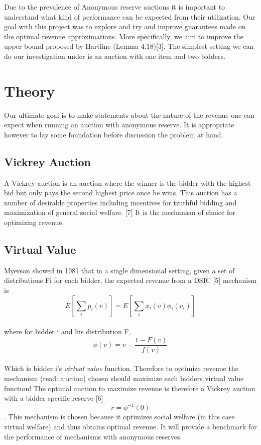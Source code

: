 \documentclass{acm_proc_article-sp}
\begin{document}
Due to the prevalence of Anonymous reserve auctions it is important to understand what kind of performance can be expected from their utilization. Our goal with this project was to explore and try and improve guarantees made on the optimal revenue approximations. More specifically, we aim to improve the upper bound proposed by Hartline (Lemma 4.18)[3]. The simplest setting we can do our investigation under is an auction with one item and two bidders.

\section{Theory}
Our ultimate goal is to make statements about the nature of the revenue one can expect when running an auction with anonymous reserve. It is appropriate however to lay some foundation before discussion the problem at hand.

\subsection{Vickrey Auction}
A Vickrey auction is an auction where the winner is the bidder with the highest bid but only pays the second highest price once he wins. This auction has a number of desirable properties including incentives for truthful bidding and maximization of general social welfare. [7] It is the mechanism of choice for optimizing revenue. 

\subsection{Virtual Value}
Myerson showed in 1981 that in a single dimensional setting, given a set of distributions Fi for each bidder, the expected revenue from a DSIC [5] mechanism is 
\[ E[\sum_{i} p_{i}(v)] = E[\sum_{i} x_{i}(v)\phi_{i}(v_{i})] \] \\
where for bidder i and his distribution F,
\[ \phi(v) = v - \frac{1-F(v)}{f(v)}\] \\
Which is bidder i's \emph{virtual value} function. Therefore to optimize revenue the mechanism (read: auction) chosen should maximize each bidders virtual value function! The optimal auction to maximize revenue is therefore a Vickrey auction with a bidder specific reserve [6] \[ r = \phi^{-1}(0)\]. This mechanism is chosen because it optimizes social welfare (in this case virtual welfare) and thus obtains optimal revenue. It will provide a benchmark for the performance of mechanisms with anonymous reserves.
\end{document}
